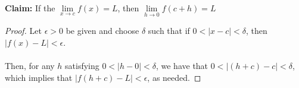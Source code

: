 \documentclass{article}
\begin{document}
\section*{}
\textbf{Claim:} If the \(\lim\limits_{x \to c} f(x) = L\), then \(\lim\limits_{h \to 0} f(c + h) = L\)
\begin{proof}
    Let \(\epsilon > 0\) be given and choose \(\delta\) such that if \(0 < |x - c| < \delta\), then \(|f(x) - L| < \epsilon\). \\ \\
    Then, for any \(h\) satisfying \(0 < |h - 0| < \delta\), we have that \(0 < |(h + c) - c| < \delta\), which implies that \(|f(h + c) - L| < \epsilon\), as needed.
\end{proof}
\end{document}
